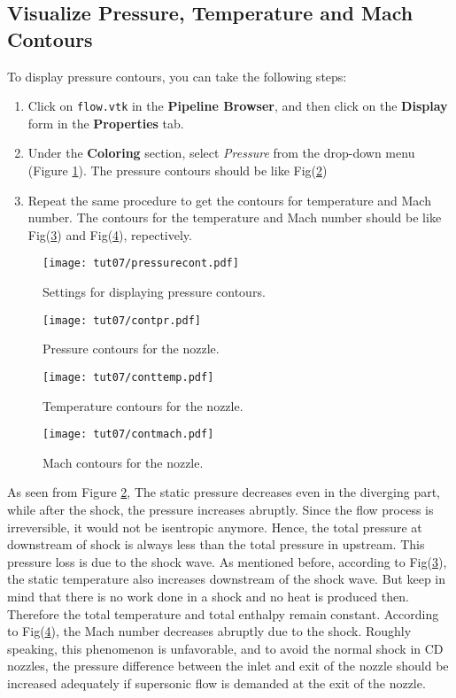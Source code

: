 \subsection{Visualize Pressure, Temperature and Mach Contours}
To display pressure contours, you can take the following steps:
\begin{enumerate}[label=\arabic*)]
	\item Click on \texttt{flow.vtk} in the \textbf{Pipeline Browser}, and then click on the \textbf{Display} form in the \textbf{Properties} tab.
	\item Under the \textbf{Coloring} section, select \textit{Pressure} from the drop-down menu (Figure \ref{fig7:pressure contours setting}). The pressure contours should be like Fig(\ref{fig7:plot pressure cont1})
	\item Repeat the same procedure to get the contours for temperature and Mach number. The contours for the temperature and Mach number should be like Fig(\ref{fig7:plot temp cont1}) and Fig(\ref{fig7:plot mach cont1}), repectively.
\end{enumerate}
\begin{figure}[H]
	\centering
	\texttt{[image: tut07/pressurecont.pdf]}
	\caption{Settings for displaying pressure contours.}
	\label{fig7:pressure contours setting}
\end{figure} 
\begin{figure}[ht]
	\centering
	\texttt{[image: tut07/contpr.pdf]}
	\caption{Pressure contours for the nozzle.}
	\label{fig7:plot pressure cont1}
\end{figure}
\begin{figure}[ht]
	\centering
	\texttt{[image: tut07/conttemp.pdf]}
	\caption{Temperature contours for the nozzle.}
	\label{fig7:plot temp cont1}
\end{figure}
\begin{figure}[H]
	\centering
	\texttt{[image: tut07/contmach.pdf]}
	\caption{Mach contours for the nozzle.}
	\label{fig7:plot mach cont1}
\end{figure}

As seen from Figure \ref{fig7:plot pressure cont1}, The static pressure decreases even in the diverging part, while after the shock, the pressure increases abruptly. Since the flow process is irreversible, it would not be isentropic anymore. Hence, the total pressure at downstream of shock is always less than the total pressure in upstream. This pressure loss is due to the shock wave. As mentioned before, according to Fig(\ref{fig7:plot temp cont1}), the static temperature also increases downstream of the shock wave. But keep in mind that there is no work done in a shock and no heat is produced then. Therefore the total temperature and total enthalpy remain constant. According to Fig(\ref{fig7:plot mach cont1}), the Mach number decreases abruptly due to the shock. Roughly speaking, this phenomenon is unfavorable, and to avoid the normal shock in CD nozzles, the pressure difference between the inlet and exit of the nozzle should be increased adequately if supersonic flow is demanded at the exit of the nozzle.

